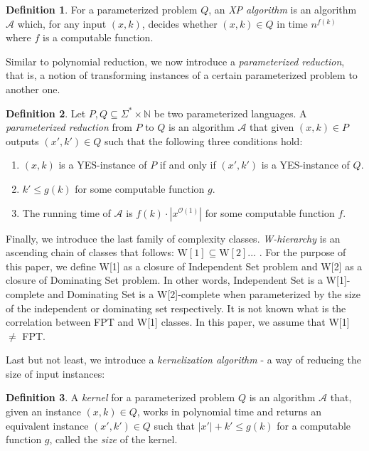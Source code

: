 \documentclass[en]{pracamgr}
\theoremstyle{definition}
\newtheorem{definition}{Definition}
\newcommand{\domsetp}{{\sc Dominating Set}}
\newcommand{\indset}{{\sc Independent Set}}
\newcommand{\w}[1]{\textrm{W}[#1]}
\begin{document}
\begin{definition}
	For a parameterized problem $Q$, an \textit{XP algorithm} is an algorithm $\mathcal{A}$ which, for any input $(x,k)$, decides whether $(x,k) \in Q$ in time $n^{f(k)}$ where $f$ is a computable function.
\end{definition}

Similar to polynomial reduction, we now introduce a \textit{parameterized reduction}, that is, a notion of transforming instances of a certain parameterized problem to another one.

\begin{definition}
	Let $P,Q \subseteq \Sigma^* \times \mathbb{N}$ be two parameterized languages. A  \textit{parameterized reduction} from $P$ to $Q$ is an algorithm $\mathcal{A}$ that given $(x,k) \in P$ outputs $(x',k') \in Q$ such that the following three conditions hold:
	\begin{enumerate}
		\item $(x,k)$ is a YES-instance of $P$ if and only if $(x',k')$ is a YES-instance of $Q$.
		\item $k' \leq g(k)$ for some computable function $g$.
		\item The running time of $\mathcal{A}$ is $f(k) \cdot |x^{\mathcal{O}(1)}|$ for some computable function $f$.
	\end{enumerate}
\end{definition}

Finally, we introduce the last family of complexity classes. \emph{W-hierarchy} is an ascending chain of classes that follows: $\w{1} \subseteq \w{2}...$ . For the purpose of this paper, we define \w{1} as a closure of \indset{} problem and \w{2} as a closure of \domsetp{} problem. In other words, \indset{} is a \w{1}-complete and \domsetp{} is a \w{2}-complete when parameterized by the size of the independent or dominating set respectively. It is not known what is the correlation between FPT and \w{1} classes. In this paper, we assume that \w{1} $\neq$ FPT. 

Last but not least, we introduce a \emph{kernelization algorithm} - a way of reducing the size of input instances:

\begin{definition}\label{Kernel}
	A \textit{kernel} for a parameterized problem $Q$ is an algorithm $\mathcal{A}$ that, given an instance $(x,k) \in Q$, works in polynomial time and returns an equivalent instance $(x',k') \in Q$
	such that $|x'| + k' \leq g(k)$ for a computable function $g$, called the \textit{size} of the kernel.
\end{definition}
\end{document}
